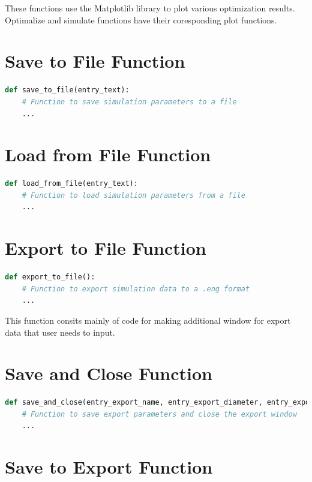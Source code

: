 \documentclass{report}
\begin{document}
These functions use the Matplotlib library to plot various optimization results. Optimalize and simulate functions have their coresponding plot functions.


\section{Save to File Function}

\begin{lstlisting}[language=Python]
def save_to_file(entry_text):
    # Function to save simulation parameters to a file
    ...
\end{lstlisting}

\section{Load from File Function}

\begin{lstlisting}[language=Python]
def load_from_file(entry_text):
    # Function to load simulation parameters from a file
    ...
\end{lstlisting}

\section{Export to File Function}

\begin{lstlisting}[language=Python]
def export_to_file():
    # Function to export simulation data to a .eng format
    ...
\end{lstlisting}
This function consits mainly of code for making additional window for export data that user needs to input.

\section{Save and Close Function}

\begin{lstlisting}[language=Python]
def save_and_close(entry_export_name, entry_export_diameter, entry_export_lenght, entry_export_man, window):
    # Function to save export parameters and close the export window
    ...
\end{lstlisting}

\section{Save to Export Function}
\end{document}
